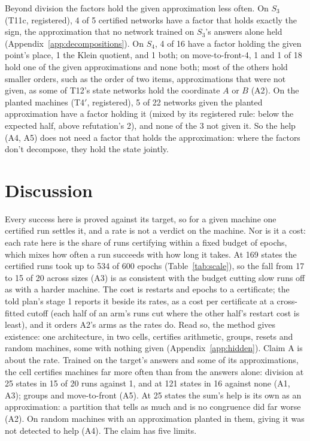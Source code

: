 \documentclass[11pt]{article}
\newcommand{\pn}[2]{#2}
\begin{document}
Beyond division the factors hold the given approximation less often. On $S_3$ (T11c, registered),
\pn{t11c.s3-parity}{4} of \pn{t11c.s3-networks}{5} certified networks have a factor that holds
exactly the sign, the approximation that no network trained on $S_3$'s answers alone held (Appendix~\ref{app:decompositions}).
On $S_4$, \pn{t11c.s4-places}{4} of \pn{t11c.s4-networks}{16} have a factor holding the given point's
place, \pn{t11c.s4-pairings}{1} the Klein quotient, and \pn{t11c.s4-pair}{1} both; on move-to-front-4,
\pn{t11c.mtf4-order}{1} and \pn{t11c.mtf4-ahead}{1} of \pn{t11c.mtf4-networks}{18} hold one of the
given approximations and \pn{t11c.mtf4-pair}{none} both; most of the others hold smaller orders, such as
the order of two items, approximations that were not given, as some of T12's state networks hold the
coordinate $A$ or $B$ (A2). On the planted machines (T4$'$, registered),
\pn{t4p.p2}{5} of \pn{t4p.p2-networks}{22} networks given the planted approximation have a factor
holding it (mixed by its registered rule: below the expected half, above refutation's 2), and
\pn{t4p.p1}{none} of the \pn{t4p.p1-networks}{3} not given it. So the help (A4, A5)
does not need a factor that holds the approximation: where the factors don't decompose, they hold
the state jointly.

\section{Discussion}
\label{sec:discussion}

Every success here is proved against its target, so for a given machine one certified run settles it,
and a rate is not a verdict on the machine. Nor is it a cost: each rate here is the share of runs
certifying within a fixed budget of epochs, which mixes how often a run succeeds with how long it
takes. At 169 states the certified runs took up to 534 of 600 epochs (Table~\ref{tab:scale}), so the fall from 17 to 15 of 20
across sizes (A3) is as consistent with the budget cutting slow runs off as with a harder machine.
The cost is restarts and epochs to a certificate; the told plan's stage 1 reports it beside its rates,
as a cost per certificate at a cross-fitted cutoff (each half of an arm's runs cut where the other half's
restart cost is least), and it orders A2's arms as the rates do. Read so, the method gives existence: one
architecture, in two cells, certifies arithmetic, groups, resets and random machines, some with nothing
given (Appendix~\ref{app:hidden}). Claim A is about the rate. Trained on the target's answers and
some of its approximations, the cell certifies machines far more often than from the answers alone:
division at 25 states in \pn{k4.claim-cover}{15} of 20 runs against \pn{k4.claim-quotient}{1}, and
at 121 states in \pn{k4.cover}{16} against \pn{k4.quotient}{none} (A1, A3); groups and
move-to-front (A5). At 25 states the sum's help is its own as an approximation: a partition that
tells as much and is no congruence did far worse (A2). On random machines with an approximation
planted in them, giving it was not detected to help (A4).
The claim has five limits.
\end{document}
